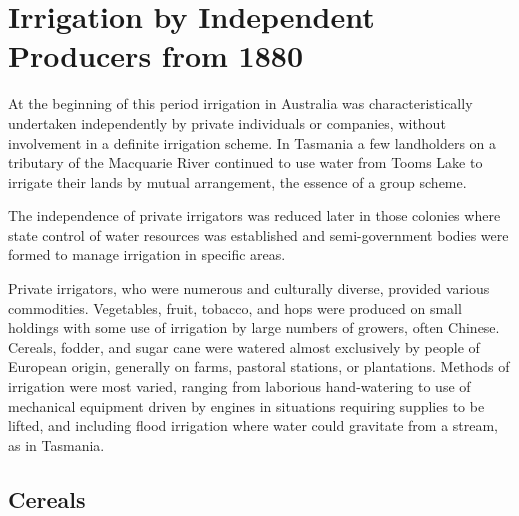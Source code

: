 
\setcounter{endnote}{0}
 
\chapter{Irrigation by Independent Producers from 1880}
\label{ch:indep}


At the beginning of this period irrigation in Australia was
characteristically undertaken independently by private individuals or
companies, without involvement in a definite irrigation scheme.  In
Tasmania a few landholders on a tributary of the Macquarie River
continued to use water from Tooms Lake to irrigate their lands by
mutual arrangement, the essence of a group scheme.

The independence of private irrigators was reduced later in those
colonies where state control of water resources was established and
semi-government bodies were formed to manage irrigation in specific
areas.

Private irrigators, who were numerous and culturally diverse, provided
various commodities.  Vegetables, fruit, tobacco, and hops were
produced on small holdings with some use of irrigation by large
numbers of growers, often Chinese.  Cereals, fodder, and sugar cane
were watered almost exclusively by people of European origin,
generally on farms, pastoral stations, or plantations.  Methods of
irrigation were most varied, ranging from laborious hand-watering to
use of mechanical equipment driven by engines in situations requiring
supplies to be lifted, and including flood irrigation where water
could gravitate from a stream, as in Tasmania.

\section*{Cereals}

